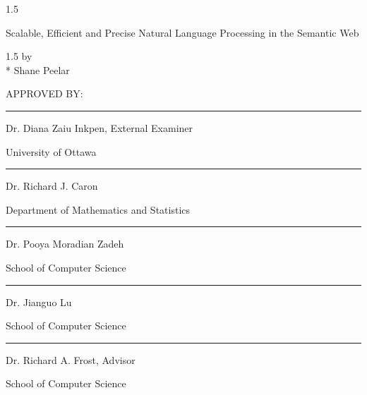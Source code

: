 \documentclass[fleqn, oneside, 12pt]{book}
\theoremstyle{definitionsty}
\newcommand{\uwinonehalfspacelen}{1.5}
\newenvironment{uwinonehalfspaceenv}%
{\begin{spacing}{\uwinonehalfspacelen}}%
	{\end{spacing}}
\newcommand{\dtitle}{Scalable, Efficient and Precise Natural Language Processing in the Semantic Web}
\begin{document}


\clearpage
\thispagestyle{empty}

\begin{center}
	\begin{uwinonehalfspaceenv}
		\parbox{6in}{\centering\dtitle}
	\end{uwinonehalfspaceenv}


	\vspace{0.35cm}
	\begin{uwinonehalfspaceenv}
		by \\*
	{Shane Peelar}
	\end{uwinonehalfspaceenv}



	\vspace{0.5in}

	APPROVED BY:

	\vspace{0.5in}

	\noindent\rule{4in}{0.4pt}

	Dr. Diana Zaiu Inkpen, External Examiner

	University of Ottawa

	\vspace{0.5in}

	\noindent\rule{4in}{0.4pt}

	Dr. Richard J. Caron

	Department of Mathematics and Statistics

	\vspace{0.5in}

	\noindent\rule{4in}{0.4pt}

	Dr. Pooya Moradian Zadeh

	School of Computer Science

	\vspace{0.5in}

	\noindent\rule{4in}{0.4pt}

	Dr. Jianguo Lu

	School of Computer Science

	\vspace{0.5in}

	\noindent\rule{4in}{0.4pt}

	Dr. Richard A. Frost, Advisor

	School of Computer Science

	\vspace{0.5in}

\end{center}
\end{document}
